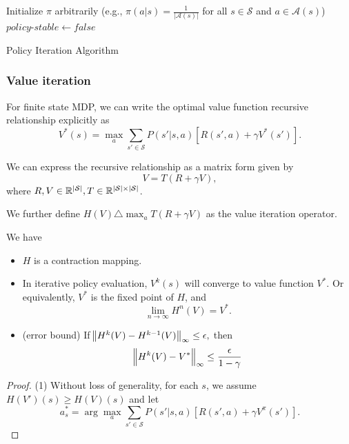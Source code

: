 \begin{refsection}
\begin{algorithm}[H]
	Initialize $\pi$ arbitrarily (e.g., $\pi(a|s)=\frac{1}{|\mathcal{A}(s)|}$ for all $s \in \mathcal{S}$ and $a \in \mathcal{A}(s)$)\\
	$policy\text{-}stable \leftarrow false$\\
	\KwRet{$\pi$}
	\caption{Policy Iteration Algorithm}
\end{algorithm}


\subsubsection{Value iteration}

\begin{theorem}
	For finite state MDP, we can write the optimal value function recursive relationship explicitly as
	$$V^*(s) = \max_a\sum_{s'\in \mathcal{S}}P(s'|s, a )[R(s',a)+ \gamma V^*(s')].$$
	
	We can express the recursive relationship as a matrix form given by
	$$V = T(R + \gamma V),$$
	where $R,V \in \mathbb{R}^{|\mathcal{S}|}, T\in \mathbb{R}^{|\mathcal{S}|\times |\mathcal{S}|}$. 
	
	We further define $H(V) \triangle \max_a T(R + \gamma V)$ as the value iteration operator. 
	
	We have
	\begin{itemize}
		\item $H$ is a contraction mapping.
		\item In iterative policy evaluation, $V^{k}(s)$ will converge to value function $V^*$. Or equivalently, $V^*$ is the fixed point of $H$, and
		$$\lim_{n\to\infty} H^{n}(V) = V^*.$$
		\item (error bound) If $\norm{H^k(V) - H^{k-1}(V)}_\infty \leq \epsilon,$ then
		$$\norm{H^k(V) - V^*}_\infty \leq \frac{\epsilon}{1 - \gamma}$$
	\end{itemize}
	
\end{theorem}
\begin{proof}
(1) Without loss of generality, for each $s$, we assume $H(V')(s) \geq H(V)(s)$ and let 
$$a_s^* = \arg\max_{a}\sum_{s'\in \mathcal{S}}P(s'|s, a )[R(s',a)+ \gamma V^\pi(s')]. $$


\end{proof}
\end{refsection}
